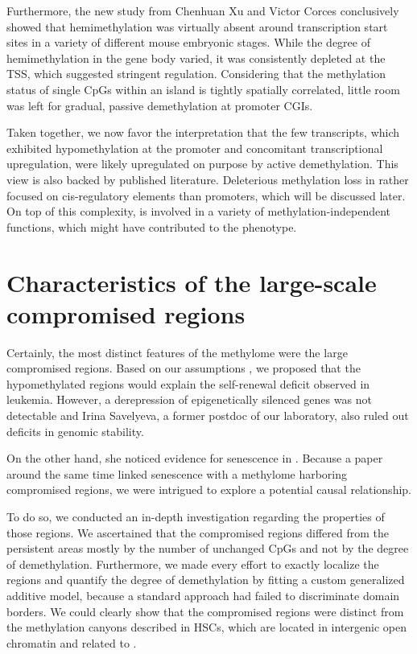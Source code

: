 Furthermore, the new study from Chenhuan Xu and Victor Corces\cite{Xu2018b} conclusively showed that hemimethylation was virtually absent around transcription start sites in a variety of different mouse embryonic stages. While the degree of hemimethylation in the gene body varied, it was consistently depleted at the TSS, which suggested stringent regulation. Considering that the methylation status of single CpGs within an island is tightly spatially correlated\cite{Hebestreit2013}, little room was left for gradual, passive demethylation at promoter CGIs. 

Taken together, we now favor the interpretation that the few transcripts, which exhibited hypomethylation at the promoter and concomitant transcriptional upregulation, were likely upregulated on purpose by active demethylation. This view is also backed by published literature\cite{DeSmet2010,He2019}. Deleterious methylation loss in \dnmtchip rather focused on cis-regulatory elements than promoters, which will be discussed later.  On top of this complexity,  is involved in a variety of methylation-independent functions, which might have contributed to the phenotype.

\section{Characteristics of the large-scale compromised regions}
\label{chap:d:methylation:compromisedregions}

Certainly, the most distinct features of the \dnmtchip methylome were the large compromised regions. Based on our assumptions , we proposed that the hypomethylated regions would explain the self-renewal deficit observed in \dnmtchip \mllafnine leukemia. However, a derepression of epigenetically silenced genes was not detectable and Irina Savelyeva, a former postdoc of our laboratory, also ruled out deficits in genomic stability. 

On the other hand, she noticed evidence for senescence in \dnmtchip. Because a paper around the same time linked senescence with a methylome harboring compromised regions\cite{Cruickshanks2013}, we were intrigued to explore a potential causal relationship.  

To do so, we conducted an in-depth investigation regarding the properties of those regions. We ascertained that the compromised regions differed from the persistent areas mostly by the number of unchanged CpGs and not by the degree of demethylation. Furthermore, we made every effort to exactly localize the regions and quantify the degree of demethylation by fitting a custom generalized additive model, because a standard approach had failed to discriminate domain borders. We could clearly show that the compromised regions were distinct from the methylation canyons described in HSCs\cite{Jeong2014}, which are located in intergenic open chromatin and related to \histhirtysixtwo\cite{Weinberg2019}.

